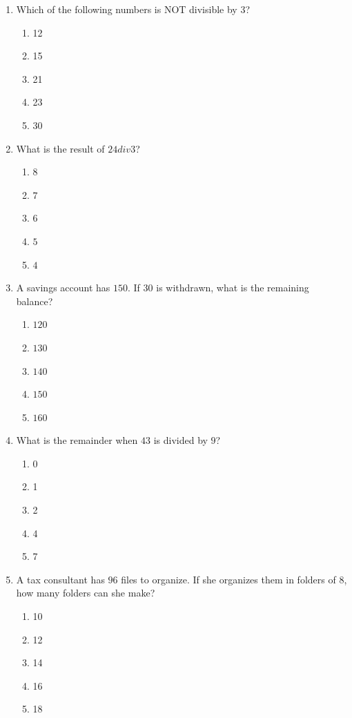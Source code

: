\documentclass[10pt]{article}
\begin{document}
\begin{multicols}{2}
\begin{enumerate}[label=\textbf{Q\arabic*.}, leftmargin=*, itemsep=6pt, parsep=0pt]
  \item \small Which of the following numbers is NOT divisible by $3$?
  \begin{enumerate}[label=(\Alph*), leftmargin=0.6cm, nosep, itemsep=2pt]
    \item 12
    \item 15
    \item 21
    \item 23
    \item 30
  \end{enumerate}

  \item \small What is the result of $24 div 3$?
  \begin{enumerate}[label=(\Alph*), leftmargin=0.6cm, nosep, itemsep=2pt]
    \item $8$
    \item $7$
    \item $6$
    \item $5$
    \item $4$
  \end{enumerate}

  \item \small A savings account has $150$. If $30$ is withdrawn, what is the remaining balance?
  \begin{enumerate}[label=(\Alph*), leftmargin=0.6cm, nosep, itemsep=2pt]
    \item $120$
    \item $130$
    \item $140$
    \item $150$
    \item $160$
  \end{enumerate}

  \item \small What is the remainder when $43$ is divided by $9$?
  \begin{enumerate}[label=(\Alph*), leftmargin=0.6cm, nosep, itemsep=2pt]
    \item 0
    \item 1
    \item 2
    \item 4
    \item 7
  \end{enumerate}

  \item \small A tax consultant has $96$ files to organize. If she organizes them in folders of $8$, how many folders can she make?
  \begin{enumerate}[label=(\Alph*), leftmargin=0.6cm, nosep, itemsep=2pt]
    \item 10
    \item 12
    \item 14
    \item 16
    \item 18
  \end{enumerate}

\end{enumerate}
\end{multicols}
\end{document}
